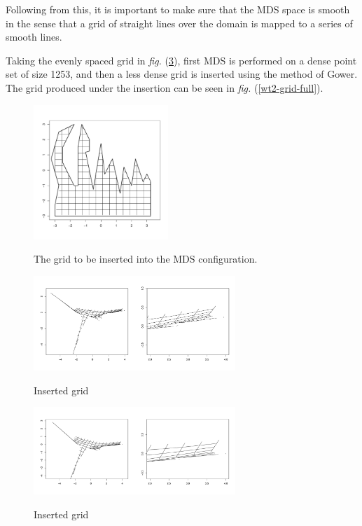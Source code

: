 \documentclass[a4paper,10pt]{amsart}
\newcommand{\fig}[1]{\emph{fig.} (\ref{#1})}
\begin{document}
Following from this, it is important to make sure that the MDS space is smooth in the sense that a grid of straight lines over the domain is mapped to a series of smooth lines. 

Taking the evenly spaced grid in \fig{wt2-grid-orig}, first MDS is performed on a dense point set of size 1253, and then a less dense grid is inserted using the method of Gower. The grid produced under the insertion can be seen in \fig{wt2-grid-full}.


\begin{figure}
\centering
\includegraphics[width=2in]{figs/wt2-grid-orig.pdf} \\
\caption{The grid to be inserted into the MDS configuration.}
\label{wt2-grid-orig}
\end{figure}

\begin{figure}
\centering
\includegraphics[width=3in]{figs/wt2-grid-full.pdf} \\
\caption{Inserted grid}
\label{wt2-grid-orig}
\end{figure}

\begin{figure}
\centering
\includegraphics[width=3in]{figs/wt2-grid-samp.pdf} \\
\caption{Inserted grid}
\label{wt2-grid-orig}
\end{figure}
\end{document}

